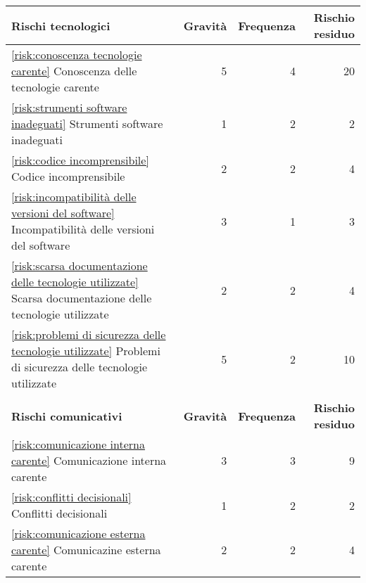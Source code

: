 \begin{table}[H]
	\centering

	\begin{tabular}{l|r|r|r}
		\hline
		\textbf{Rischi tecnologici}                                                          & \textbf{Gravità} & \textbf{Frequenza} & \textbf{Rischio residuo} \\
		\hline
		\autoref{risk:conoscenza tecnologie carente} Conoscenza delle tecnologie carente     & 5                & 4                  & 20                       \\
		\autoref{risk:strumenti software inadeguati} Strumenti software inadeguati           & 1                & 2                  & 2                        \\
		\autoref{risk:codice incomprensibile} Codice incomprensibile                         & 2                & 2                  & 4                        \\
		\autoref{risk:incompatibilità delle versioni del software} 
		Incompatibilità delle versioni del software											 & 3                & 1                  & 3                        \\
		\autoref{risk:scarsa documentazione delle tecnologie utilizzate} 
		Scarsa documentazione delle tecnologie utilizzate	   								 & 2                & 2                  & 4                        \\
		\autoref{risk:problemi di sicurezza delle tecnologie utilizzate} 
		Problemi di sicurezza delle tecnologie utilizzate	   								 & 5                & 2                  & 10                        \\
		\hline
		\multicolumn{4}{l}{}                                                                                                                                    \\
		\hline
		\textbf{Rischi comunicativi}                                                         & \textbf{Gravità} & \textbf{Frequenza} & \textbf{Rischio residuo} \\
		\hline
		\autoref{risk:comunicazione interna carente} Comunicazione interna carente           & 3                & 3                  & 9                        \\
		\autoref{risk:conflitti decisionali} Conflitti decisionali                           & 1                & 2                  & 2                        \\
		\autoref{risk:comunicazione esterna carente} Comunicazine esterna carente            & 2                & 2                  & 4                        \\

\end{tabular}
\end{table}
